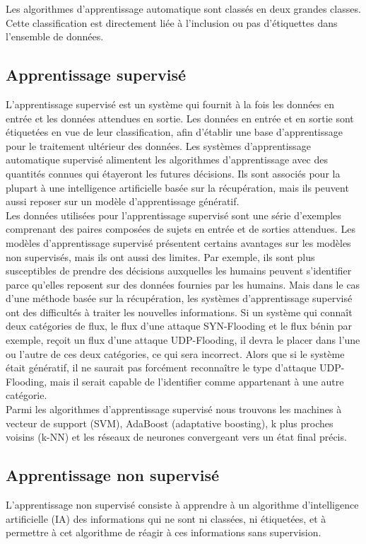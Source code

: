 \noindent Les algorithmes d’apprentissage automatique sont classés en deux grandes classes. Cette classification est directement liée à l’inclusion ou pas d’étiquettes dans l’ensemble de données.

\subsection{Apprentissage supervisé}
L’apprentissage supervisé est un système qui fournit à la fois les données en entrée et les données attendues en sortie. Les données en entrée et en sortie sont étiquetées en vue de leur classification, afin d'établir une base d'apprentissage pour le traitement ultérieur des données. Les systèmes d'apprentissage automatique supervisé alimentent les algorithmes d'apprentissage avec des quantités connues qui étayeront les futures décisions. Ils sont associés pour la plupart à une intelligence artificielle basée sur la récupération, mais ils peuvent aussi reposer sur un modèle d'apprentissage génératif.\\

\noindent Les données utilisées pour l'apprentissage supervisé sont une série d'exemples comprenant des paires composées de sujets en entrée et de sorties attendues. Les modèles d'apprentissage supervisé présentent certains avantages sur les modèles non supervisés, mais ils ont aussi des limites. Par exemple, ils sont plus susceptibles de prendre des décisions auxquelles les humains peuvent s'identifier parce qu'elles reposent sur des données fournies par les humains. Mais dans le cas d'une méthode basée sur la récupération, les systèmes d'apprentissage supervisé ont des difficultés à traiter les nouvelles informations. Si un système qui connaît deux catégories de flux, le flux d’une attaque SYN-Flooding et le flux bénin par exemple, reçoit un flux d’une attaque UDP-Flooding, il devra le placer dans l'une ou l'autre de ces deux catégories, ce qui sera incorrect. Alors que si le système était génératif, il ne saurait pas forcément reconnaître le type d’attaque UDP-Flooding, mais il serait capable de l'identifier comme appartenant à une autre catégorie. \\

\noindent Parmi les algorithmes d’apprentissage supervisé nous trouvons les machines à vecteur de support (SVM),  AdaBoost (adaptative boosting), k plus proches voisins (k-NN) et les réseaux de neurones convergeant vers un état final précis.

\subsection{Apprentissage non supervisé}
L’apprentissage non supervisé consiste à apprendre à un algorithme d'intelligence artificielle (IA) des informations qui ne sont ni classées, ni étiquetées, et à permettre à cet algorithme de réagir à ces informations sans supervision.\\

